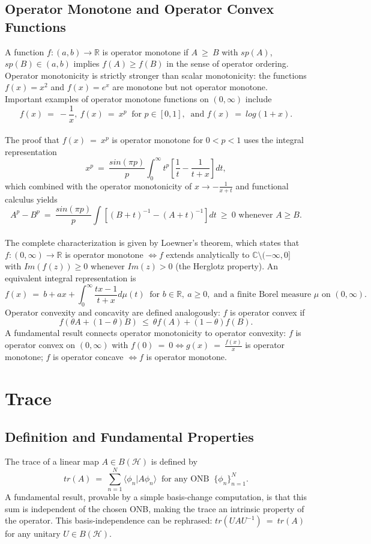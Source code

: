 \documentclass[11pt,a4paper]{article}
\begin{document}
\subsection{Operator Monotone and Operator Convex Functions}
A function $f: (a,b) \rightarrow \mathbb{R}$ is operator monotone if $A\ \geq\ B$ with $sp(A)$, $sp(B) \in (a,b)$ implies $f(A) \geq f(B)$ in the sense of operator ordering. Operator monotonicity is strictly stronger than scalar monotonicity: the functions $f(x) = x^2$ and $f(x) = e^x$ are monotone but not operator monotone. Important examples of operator monotone functions on $(0, \infty)$ include $$f(x)\ =\ -\frac{1}{x},\ f(x)\ =\ x^p\ \text{ for } p \in [0,1],\ \text{ and } f(x)\ =\ log(1 + x).$$ \\

The proof that $f(x)\ =\ x^p$ is operator monotone for $0 < p < 1$ uses the integral representation $$x^p\ =\ \frac{sin(\pi p)}{p} \int_0^\infty t^p \left[\frac{1}{t}-\frac{1}{t+x}\right] dt,$$ which combined with the operator monotonicity of $x \rightarrow -\frac{1}{x+t}$ and functional calculus yields $$A^p - B^p\ =\ \frac{sin(\pi p)}{p} \int [(B+t)^{-1} - (A+t)^{-1}] dt\ \geq\ 0 \text{ whenever } A \geq B.$$ \\

The complete characterization is given by Loewner's theorem, which states that $f: (0,\infty) \rightarrow \mathbb{R}$ is operator monotone $\Leftrightarrow f$ extends analytically to $\mathbb{C} \setminus (-\infty, 0]$ with $Im(f(z)) \geq 0$ whenever $Im(z) > 0$ (the Herglotz property). An equivalent integral representation is $$f(x)\ =\ b + ax + \int_0^\infty \frac{tx - 1}{t + x} d \mu(t) \ \text{ for } b \in \mathbb{R},\ a \geq 0, \text{ and a finite Borel measure } \mu \text{ on } (0, \infty).$$ Operator convexity and concavity are defined analogously: $f$ is operator convex if $$f(\theta A + (1-\theta)B)\ \leq\ \theta f(A) + (1-\theta) f(B).$$ A fundamental result connects operator monotonicity to operator convexity: $f$ is operator convex on $(0, \infty)$ with $f(0)\ =\ 0 \Leftrightarrow g(x)\ =\ \frac{f(x)}{x}$ is operator monotone; $f$ is operator concave $\Leftrightarrow f$ is operator monotone.
\pagebreak
\clearpage
\null
\clearpage
\section{Trace}
\label{sec:trace}
\subsection{Definition and Fundamental Properties}
The trace of a linear map $A \in B(\mathcal{H})$ is defined by $$tr(A)\ =\ \sum_{n=1}^N \langle \phi_n | A \phi_n \rangle\ \text{ for any ONB }\ \{\phi_n\}_{n=1}^N.$$ A fundamental result, provable by a simple basis-change computation, is that this sum is independent of the chosen ONB, making the trace an intrinsic property of the operator. This basis-independence can be rephrased: $tr(UAU^{-1})\ =\ tr(A)$ for any unitary $U \in B(\mathcal{H})$. \\
\end{document}
